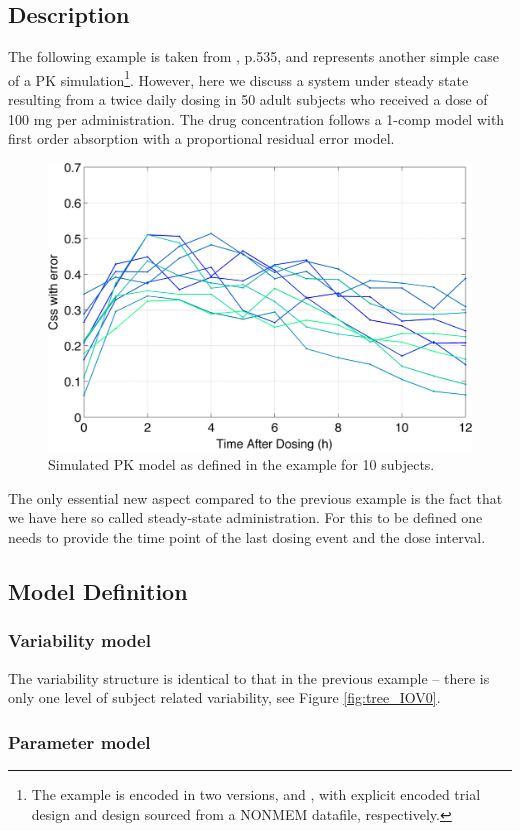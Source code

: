 \subsection{Description}

The following example is taken from \cite{Bonate:2011fk}, p.535, and 
represents another simple case of a PK simulation\footnote{The example is encoded in two versions,  
 and , with explicit encoded trial 
design and design sourced from a NONMEM datafile, respectively.}. However, here 
we discuss a system under steady state resulting from a twice daily 
dosing in 50 adult subjects who received a dose of 100 mg per administration. 
The drug concentration follows a 1-comp model with first order absorption 
with a proportional residual error model.
\begin{figure}[ht!]
\begin{center}
\includegraphics[width=.45\textwidth]{pics/Bonate_Css_proportionalError}
\caption{Simulated PK model as defined in the example for 10 subjects.}
\label{fig:BonatePK}
\vspace{-20pt}
\end{center}
\end{figure}
The only essential new aspect compared to the previous example is the fact
that we have here so called steady-state administration. For this to be defined
one needs to provide the time point of the last dosing event and the dose interval.

\subsection{Model Definition}
\subsubsection{Variability model}
The variability structure is identical to that in the previous example -- there is only
one level of subject related variability, see Figure \ref{fig:tree_IOV0}.

\subsubsection{Parameter model}


